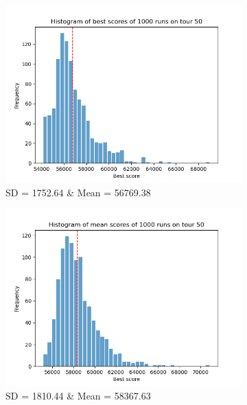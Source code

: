 \documentclass[a4paper,10pt]{article}
\begin{document}
\begin{figure}
     \centering
     \begin{subfigure}[b]{0.49\textwidth}
         \centering
         \includegraphics[width=\textwidth]{plots/hist_best}
         \caption{SD = 1752.64 \& Mean = 56769.38}
         \label{fig:histb}
     \end{subfigure}
     \hfill
     \begin{subfigure}[b]{0.49\textwidth}
         \centering
         \includegraphics[width=\textwidth]{plots/hist_mean}
         \caption{SD = 1810.44 \& Mean = 58367.63}
         \label{fig:histm}
     \end{subfigure}
          \begin{subfigure}[b]{0.49\textwidth}

\end{subfigure}
\end{figure}
\end{document}

